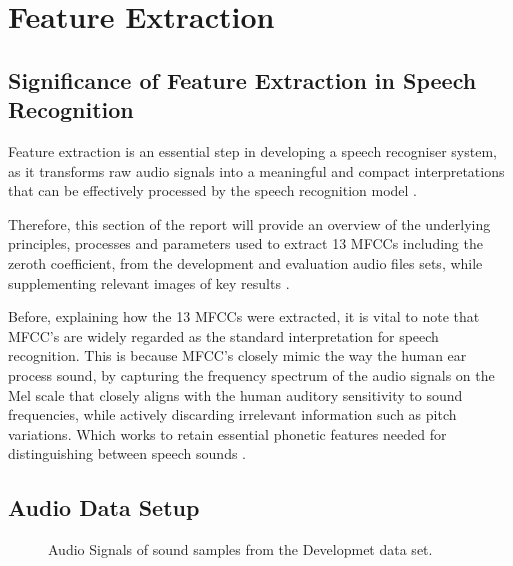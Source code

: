 \documentclass{article}
\begin{document}

\section{Feature Extraction}

\subsection{Significance of Feature Extraction in Speech Recognition}
Feature extraction is an essential step in developing a speech recogniser system, as it transforms raw audio signals into a meaningful and compact interpretations that can be effectively processed by the speech recognition model \citep{1692543}.

Therefore, this section of the report will provide an overview of the underlying principles, processes and parameters used to extract 13 MFCCs including the zeroth coefficient, from the development and evaluation audio files sets, while supplementing relevant images of key results \citep{1692543}.

Before, explaining how the 13 MFCCs were extracted, it is vital to note that MFCC’s are widely regarded as the standard interpretation for speech recognition. This is because MFCC’s closely mimic the way the human ear process sound, by capturing the frequency spectrum of the audio signals on the Mel scale that closely aligns with the human auditory sensitivity to sound frequencies, while actively discarding irrelevant information such as pitch variations. Which works to retain essential phonetic features needed for distinguishing between speech sounds \citep{1692543}. 

\subsection{Audio Data Setup}


\begin{figure}[!h]
  \centering
  \hfill
  \hfill
  \hfill
  \caption{\label{fig:audio} Audio Signals of sound samples from the Developmet data set.}
\end{figure}
\end{document}
